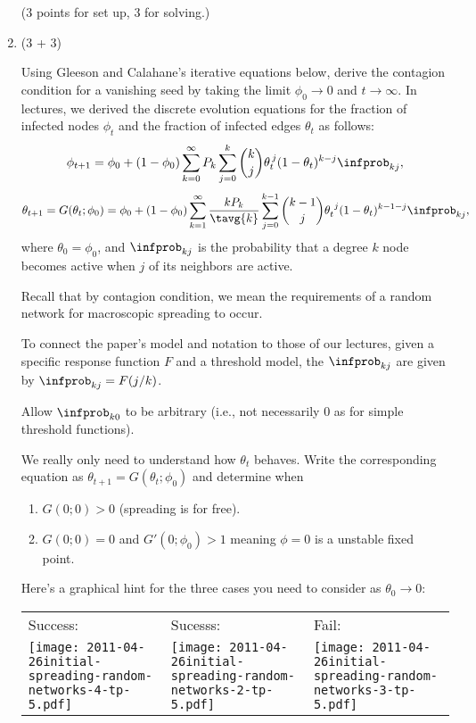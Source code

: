\begin{enumerate}
  (3 points for set up, 3 for solving.)

  
   \solutionstart


   \solutionend

\item (3 + 3)

  Using Gleeson and Calahane's iterative equations below,
  derive the contagion condition for
  a vanishing seed by taking the limit
  $\phi_{0} \rightarrow 0$ and $t \rightarrow \infty$.
  In lectures, we derived the discrete evolution equations
  for the fraction of infected nodes $\phi_{t}$
  and the fraction of infected edges $\theta_{t}$ as follows:
  $$
  \phi_{t+1}
  = 
  \phi_{0}
  + 
  (1-\phi_{0})
  \sum_{k=0}^{\infty}
  P_{k}
  \sum_{j=0}^{k}
  \binom{k}{j}
  \theta_{t}^{\, j}
  (1-\theta_{t})^{k-j} 
  \infprob_{kj},
  $$
  $$
  \theta_{t+1}
  =
  G(\theta_{t};\phi_{0})
  =
  \phi_{0} +
  (1-\phi_{0})
  \sum_{k=1}^{\infty}
  \frac{k P_{k}}{\tavg{k}}
  \sum_{j=0}^{k-1}
  \binom{k-1}{j}
  \theta_{t}^{\ j}
  (1-\theta_{t})^{k-1-j}
  \infprob_{kj},
  $$
  where $\theta_{0} = \phi_{0}$, and 
  $\infprob_{kj}$ is the probability 
  that a degree $k$ node becomes active
  when $j$ of its neighbors are active.

  Recall that by contagion condition, we mean
  the requirements of a random network for
  macroscopic spreading to occur.

  To connect the paper's model and notation
  to those of our lectures,
  given a specific response function $F$
  and a threshold model,
  the $\infprob_{kj}$ are given by
  $\infprob_{kj} = F(j/k)$.

  Allow $\infprob_{k0}$ to be arbitrary (i.e., not necessarily
  0 as for simple threshold functions).

  We really only need to understand how
  $\theta_{t}$ behaves.  Write the corresponding equation
  as $\theta_{t+1} = G(\theta_{t};\phi_{0})$ and determine
  when 
  \begin{enumerate}
  \item 
    $G(0;0) > 0$ (spreading is for free).
  \item 
    $G(0;0) = 0$ and $G'(0;\phi_{0}) > 1$ 
    meaning $\phi=0$ is a unstable fixed point.
  \end{enumerate}

  Here's a graphical hint for the three cases 
  you need to consider as $\theta_{0} \rightarrow 0$:
  \begin{tabular}{lll}
    Success: &
    Sucesss: & 
    Fail: \\
    \texttt{[image: 2011-04-26initial-spreading-random-networks-4-tp-5.pdf]} &
    \texttt{[image: 2011-04-26initial-spreading-random-networks-2-tp-5.pdf]} &
    \texttt{[image: 2011-04-26initial-spreading-random-networks-3-tp-5.pdf]}
  \end{tabular}


\end{enumerate}
